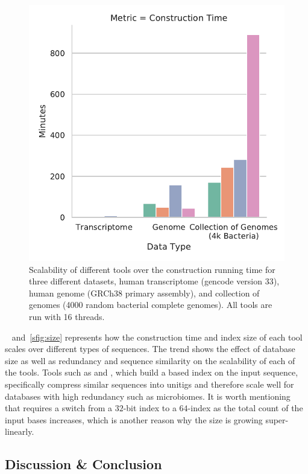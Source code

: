 \begin{figure}%
    \includegraphics[width=0.8\columnwidth,type=pdf,ext=.pdf,read=.pdf]
    {Figures/puff/indexTimeScale}
    \caption[scalability of different aligners - time]
    {Scalability of different tools over the construction running time for three
    different datasets, human transcriptome (gencode version 33), human
    genome (GRCh38 primary assembly), and collection of genomes (4000
    random bacterial complete genomes). All tools are run with 16 threads.}
    \label{sfig:construction}
    \vspace{-0.2in}
\end{figure}

~ and~\cref{sfig:size} represents how the construction time and
index size of each tool scales over different types of sequences. 
The trend shows the effect of database size as well as redundancy and sequence similarity on
the scalability of each of the tools. Tools such as \puffaligner and
\debga, which build a \dbg based index on the input sequence,
specifically compress similar sequences into unitigs and therefore
scale well for databases with high redundancy such as microbiomes. It is 
worth mentioning that \bt requires a switch from a $32$-bit
index to a $64$-index as the total count of the input bases
increases, which is another reason why the size is growing super-linearly.

\subsection{Discussion \& Conclusion}
\label{sec:conclusion}

